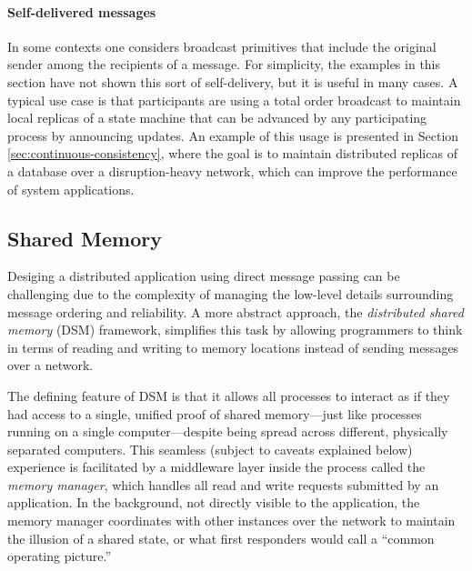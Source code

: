 \documentclass[]             %
{NASA}                       %
\theoremstyle{definition}
\begin{document}
\paragraph{Self-delivered messages}
In some contexts one considers broadcast primitives that include the
original sender among the recipients of a message. For simplicity, the
examples in this section have not shown this sort of self-delivery,
but it is useful in many cases. A typical use case is that
participants are using a total order broadcast to maintain local
replicas of a state machine that can be advanced by any participating
process by announcing updates. An example of this usage is presented
in Section \ref{sec:continuous-consistency}, where the goal is to
maintain distributed replicas of a database over a disruption-heavy
network, which can improve the performance of system applications.



\subsection{Shared Memory}
\label{ssec:shared-memory}
Desiging a distributed application using direct message passing can be
challenging due to the complexity of managing the low-level details
surrounding message ordering and reliability. A more abstract
approach, the \emph{distributed shared memory} (DSM) framework,
simplifies this task by allowing programmers to think in terms of
reading and writing to memory locations instead of sending messages
over a network.

The defining feature of DSM is that it allows all processes to
interact as if they had access to a single, unified proof of shared
memory---just like processes running on a single computer---despite
being spread across different, physically separated computers.  This
seamless (subject to caveats explained below) experience is
facilitated by a middleware layer inside the process called the
\emph{memory manager}, which handles all read and write requests
submitted by an application. In the background, not directly visible
to the application, the memory manager coordinates with other
instances over the network to maintain the illusion of a shared state,
or what first responders would call a ``common operating picture.''
\end{document}
